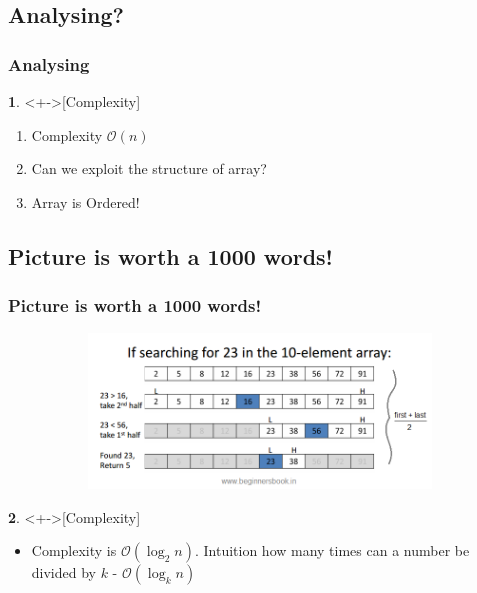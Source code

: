 \documentclass[mathserif,notheorems]{beamer} %
\newcommand{\Olo}{$\mathcal{O}(\log_{2}n)$}
\theoremstyle{plain} %
\theoremstyle{definition} %
\newtheorem*{definition}{}%
\begin{document}
\subsection{Analysing?}
\begin{frame}
\frametitle{Analysing}
\begin{definition}<+->[Complexity]
\begin{enumerate}
	\item Complexity $\mathcal{O}(n)$
	\item Can we exploit the structure of array?
	\item Array is Ordered!
\end{enumerate}
\end{definition}
\end{frame}

\subsection{Picture is worth a 1000 words!}
\begin{frame}
\frametitle{Picture is worth a 1000 words!}
\begin{figure}[!htb]
	\begin{subfigure}{\textwidth}
		\centering
		\includegraphics[width=1\textwidth]{binary-search-algorithm.png}
	\end{subfigure}
\end{figure}

\begin{definition}<+->[Complexity]
	\begin{itemize}
		\item Complexity is \Olo. Intuition how many times can a number be divided by $k$ - $\mathcal{O}(\log_{k} {n})$
	\end{itemize}
\end{definition}
\end{frame}
\end{document}
